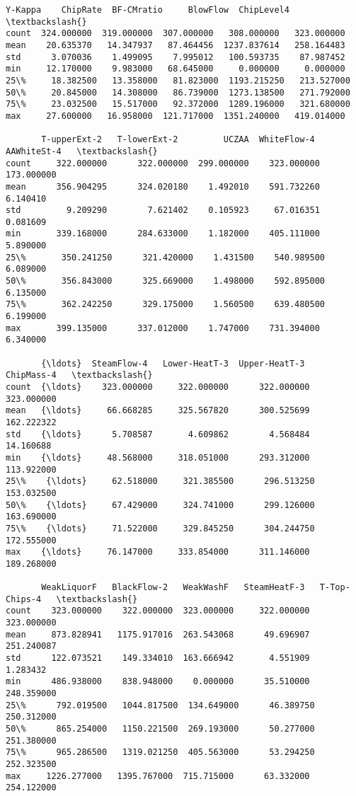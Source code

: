 \documentclass[11pt]{article}
\makeatletter
\newcommand{\boxspacing}{\kern\kvtcb@left@rule\kern\kvtcb@boxsep}
\newcommand{\prompt}[4]{
        {\ttfamily\llap{{\color{#2}[#3]:\hspace{3pt}#4}}\vspace{-\baselineskip}}
    }
\makeatother
\begin{document}
            \begin{tcolorbox}[breakable, size=fbox, boxrule=.5pt, pad at break*=1mm, opacityfill=0]
\prompt{Out}{outcolor}{6}{\boxspacing}
\begin{Verbatim}[commandchars=\\\{\}]
          Y-Kappa    ChipRate  BF-CMratio     BlowFlow  ChipLevel4   \textbackslash{}
count  324.000000  319.000000  307.000000   308.000000   323.000000
mean    20.635370   14.347937   87.464456  1237.837614   258.164483
std      3.070036    1.499095    7.995012   100.593735    87.987452
min     12.170000    9.983000   68.645000     0.000000     0.000000
25\%     18.382500   13.358000   81.823000  1193.215250   213.527000
50\%     20.845000   14.308000   86.739000  1273.138500   271.792000
75\%     23.032500   15.517000   92.372000  1289.196000   321.680000
max     27.600000   16.958000  121.717000  1351.240000   419.014000

       T-upperExt-2   T-lowerExt-2         UCZAA  WhiteFlow-4   AAWhiteSt-4   \textbackslash{}
count     322.000000      322.000000  299.000000    323.000000    173.000000
mean      356.904295      324.020180    1.492010    591.732260      6.140410
std         9.209290        7.621402    0.105923     67.016351      0.081609
min       339.168000      284.633000    1.182000    405.111000      5.890000
25\%       350.241250      321.420000    1.431500    540.989500      6.089000
50\%       356.843000      325.669000    1.498000    592.895000      6.135000
75\%       362.242250      329.175000    1.560500    639.480500      6.199000
max       399.135000      337.012000    1.747000    731.394000      6.340000

       {\ldots}  SteamFlow-4   Lower-HeatT-3  Upper-HeatT-3   ChipMass-4   \textbackslash{}
count  {\ldots}    323.000000     322.000000      322.000000   323.000000
mean   {\ldots}     66.668285     325.567820      300.525699   162.222322
std    {\ldots}      5.708587       4.609862        4.568484    14.160688
min    {\ldots}     48.568000     318.051000      293.312000   113.922000
25\%    {\ldots}     62.518000     321.385500      296.513250   153.032500
50\%    {\ldots}     67.429000     324.741000      299.126000   163.690000
75\%    {\ldots}     71.522000     329.845250      304.244750   172.555000
max    {\ldots}     76.147000     333.854000      311.146000   189.268000

       WeakLiquorF   BlackFlow-2   WeakWashF   SteamHeatF-3   T-Top-Chips-4   \textbackslash{}
count    323.000000    322.000000  323.000000     322.000000      323.000000
mean     873.828941   1175.917016  263.543068      49.696907      251.240087
std      122.073521    149.334010  163.666942       4.551909        1.283432
min      486.938000    838.948000    0.000000      35.510000      248.359000
25\%      792.019500   1044.817500  134.649000      46.389750      250.312000
50\%      865.254000   1150.221500  269.193000      50.277000      251.380000
75\%      965.286500   1319.021250  405.563000      53.294250      252.323500
max     1226.277000   1395.767000  715.715000      63.332000      254.122000


\end{Verbatim}
\end{tcolorbox}
\end{document}
